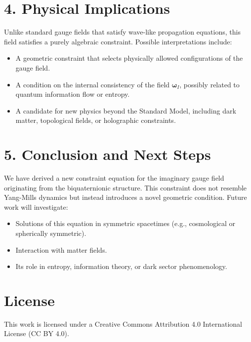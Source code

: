 \documentclass[12pt]{article}
\begin{document}
\section*{4. Physical Implications}

Unlike standard gauge fields that satisfy wave-like propagation equations, this field satisfies a purely algebraic constraint. Possible interpretations include:
\begin{itemize}
  \item A geometric constraint that selects physically allowed configurations of the gauge field.
  \item A condition on the internal consistency of the field \(\boldsymbol{\omega}_I\), possibly related to quantum information flow or entropy.
  \item A candidate for new physics beyond the Standard Model, including dark matter, topological fields, or holographic constraints.
\end{itemize}

\section*{5. Conclusion and Next Steps}

We have derived a new constraint equation for the imaginary gauge field originating from the biquaternionic structure. This constraint does not resemble Yang-Mills dynamics but instead introduces a novel geometric condition. Future work will investigate:
\begin{itemize}
  \item Solutions of this equation in symmetric spacetimes (e.g., cosmological or spherically symmetric).
  \item Interaction with matter fields.
  \item Its role in entropy, information theory, or dark sector phenomenology.
\end{itemize}


\section*{License}
This work is licensed under a Creative Commons Attribution 4.0 International License (CC BY 4.0).
\end{document}
